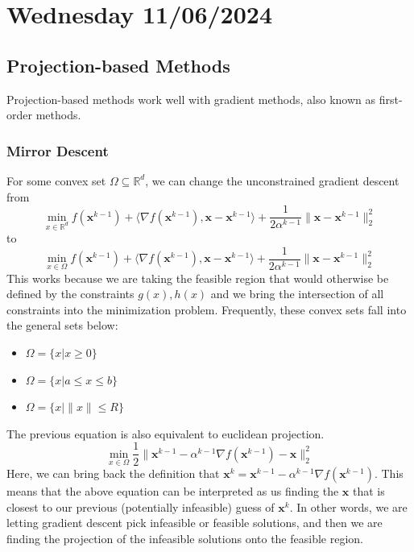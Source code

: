 \section{Wednesday 11/06/2024}
\subsection{Projection-based Methods}
Projection-based methods work well with gradient methods, also known as first-order methods. 
\subsubsection{Mirror Descent}
For some convex set $\Omega \subseteq \mathbb{R}^d$, we can change the unconstrained gradient descent from 
\begin{equation}
  \min_{x \in \mathbb{R}^d } f(\textbf{x}^{k-1}) + \langle \nabla f(\textbf{x}^{k-1}), \textbf{x} - \textbf{x}^{k-1}  \rangle + \frac{1}{2 \alpha^{k-1}} \| \textbf{x} - \textbf{x}^{k-1} \|_2^2
\end{equation}
to 
\begin{equation}
  \min_{x \in \Omega } f(\textbf{x}^{k-1}) + \langle \nabla f(\textbf{x}^{k-1}), \textbf{x} - \textbf{x}^{k-1}  \rangle + \frac{1}{2 \alpha^{k-1}} \| \textbf{x} - \textbf{x}^{k-1} \|_2^2
\end{equation}
This works because we are taking the feasible region that would otherwise be defined by the constraints $g(x),h(x)$ and we bring the intersection of all constraints into the minimization problem. Frequently, these convex sets fall into the general sets below:
\begin{itemize}
  \item $\Omega = \{ x | x \geq 0 \}$
  \item $\Omega = \{ x | a \leq x \leq b \}$
  \item $\Omega = \{ x | \| x \| \leq R \}$
\end{itemize}

The previous equation is also equivalent to euclidean projection.
\begin{equation}
  \min_{x \in \Omega} \frac{1}{2} \| \textbf{x}^{k-1} - \alpha^{k-1} \nabla f(\textbf{x}^{k-1}) - \textbf{x}\|_2^2
\end{equation}
Here, we can bring back the definition that $\textbf{x}^k = \textbf{x}^{k-1} - \alpha^{k-1} \nabla f(\textbf{x}^{k-1})$. This means that the above equation can be interpreted as us finding the $\textbf{x}$ that is closest to our previous (potentially infeasible) guess of $\textbf{x}^k$. In other words, we are letting gradient descent pick infeasible or feasible solutions, and then we are finding the projection of the infeasible solutions onto the feasible region.
